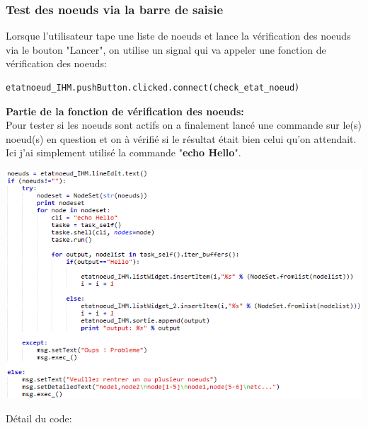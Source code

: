 \documentclass[a4paper,11pt]{article}
\begin{document}
\subsubsection{Test des noeuds via la barre de saisie}
Lorsque l'utilisateur tape une liste de noeuds et lance la vérification des noeuds via le bouton "Lancer", on utilise un signal qui va appeler une fonction de vérification des noeuds:\\
\begin{lstlisting}
etatnoeud_IHM.pushButton.clicked.connect(check_etat_noeud)
\end{lstlisting}
\textbf{Partie de la fonction de vérification des noeuds:}\\
Pour tester si les noeuds sont actifs on a finalement lancé une commande sur le(s) noeud(s) en question et on à vérifié si le résultat était bien celui qu'on attendait. Ici j'ai simplement utilisé la commande "\textbf{echo Hello}".
\begin{flushleft}
\includegraphics[scale=1]{check_etatnoeud.png} 
\end{flushleft}
Détail du code:\\
\end{document}
